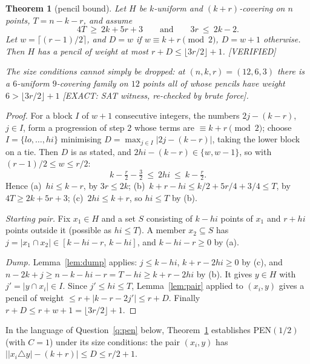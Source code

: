 \documentclass[11pt]{article}
\newtheorem{theorem}{Theorem}[section]
\theoremstyle{definition}
\newcommand{\st}[1]{\textsf{\small[#1]}}
\begin{document}
\begin{theorem}[pencil bound]\label{thm:pen}
Let $H$ be $k$-uniform and $(k+r)$-covering on $n$ points, $T=n-k-r$, and assume
\[
4T\ \ge\ 2k+5r+3\qquad\text{and}\qquad 3r\ \le\ 2k-2 .
\]
Let $w=\lceil(r-1)/2\rceil$, and $D=w$ if $w\equiv k+r\pmod 2$, $D=w+1$ otherwise. Then $H$ has a pencil of weight at
most $r+D\le\lfloor3r/2\rfloor+1$. \st{VERIFIED}

The size conditions cannot simply be dropped: at $(n,k,r)=(12,6,3)$ there is a $6$-uniform $9$-covering family on
$12$ points all of whose pencils have weight $6>\lfloor3r/2\rfloor+1$ \st{EXACT: SAT witness, re-checked by brute force}.
\end{theorem}
\begin{proof}
For a block $I$ of $w+1$ consecutive integers, the numbers $2j-(k-r)$, $j\in I$, form a progression of step $2$ whose
terms are $\equiv k+r\pmod2$; choose $I=\{lo,\dots,hi\}$ minimising $D=\max_{j\in I}|2j-(k-r)|$, taking the lower block on a
tie. Then $D$ is as stated, and $2hi-(k-r)\in\{w,w-1\}$, so with $(r-1)/2\le w\le r/2$:
\[
k-\tfrac r2-\tfrac32\ \le\ 2hi\ \le\ k-\tfrac r2 .
\]
Hence (a)~$hi\le k-r$, by $3r\le2k$; (b)~$k+r-hi\le k/2+5r/4+3/4\le T$, by $4T\ge2k+5r+3$; (c)~$2hi\le k+r$, so
$hi\le T$ by (b).

\emph{Starting pair.} Fix $x_1\in H$ and a set $S$ consisting of $k-hi$ points of $x_1$ and $r+hi$ points outside it
(possible as $hi\le T$). A member $x_2\subseteq S$ has $j=|x_1\cap x_2|\in[k-hi-r,\,k-hi]$, and $k-hi-r\ge0$ by (a).

\emph{Dump.} Lemma~\ref{lem:dump} applies: $j\le k-hi$, $k+r-2hi\ge0$ by (c), and $n-2k+j\ge n-k-hi-r=T-hi\ge k+r-2hi$
by (b). It gives $y\in H$ with $j'=|y\cap x_i|\in I$. Since $j'\le hi\le T$, Lemma~\ref{lem:pair} applied to $(x_i,y)$
gives a pencil of weight $\le r+|k-r-2j'|\le r+D$. Finally $r+D\le r+w+1=\lfloor3r/2\rfloor+1$.
\end{proof}
In the language of Question~\ref{q:pen} below, Theorem~\ref{thm:pen} establishes PEN$(1/2)$ (with $C=1$) under its size
conditions: the pair $(x_i,y)$ has $\big||x_i\triangle y|-(k+r)\big|\le D\le r/2+1$.
\end{document}
